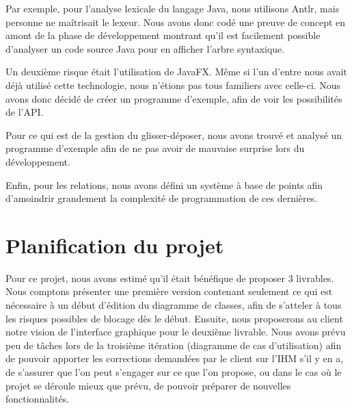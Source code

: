 \documentclass[hidelinks, 10pt,a4paper]{article}
\begin{document}
Par exemple, pour l'analyse lexicale du langage Java, nous utilisons Antlr, mais
personne ne maîtrisait le lexeur. Nous avons donc codé une preuve de concept en amont
de la phase de développement montrant qu'il est facilement possible d'analyser
un code source Java pour en afficher l'arbre syntaxique.

Un deuxième risque était l'utilisation de JavaFX. Même si l'un d'entre nous avait
déjà utilisé cette technologie, nous n'étions pas tous familiers avec celle-ci.
Nous avons donc décidé de créer un programme d'exemple, afin de voir les possibilités
de l'API.

Pour ce qui est de la gestion du glisser-déposer, nous avons trouvé et analysé
un programme d'exemple afin de ne pas avoir de mauvaise surprise lors du développement.

Enfin, pour les relations, nous avons défini un système à base de points afin d'amoindrir
grandement la complexité de programmation de ces dernières.

\section{Planification du projet}
Pour ce projet, nous avons estimé qu'il était bénéfique de proposer 3 livrables.
Nous comptons présenter une première version contenant seulement
ce qui est nécessaire à un début d'édition du diagramme de classes, afin de
s'atteler à tous les risques possibles de blocage dès le début. Ensuite, nous proposerons
au client notre vision de l'interface graphique pour le deuxième livrable. Nous avons prévu peu
de tâches lors de la troisième itération (diagramme de cas d'utilisation) afin de pouvoir
apporter les corrections demandées par le client sur l'IHM s'il y en a, de s'assurer que
l'on peut s'engager sur ce que l'on propose, ou dans le cas où le projet se déroule mieux
que prévu, de pouvoir préparer de nouvelles fonctionnalités.
\end{document}
